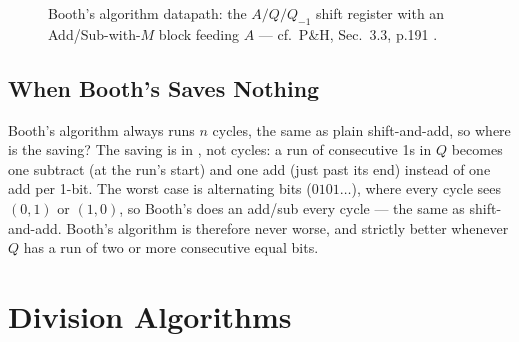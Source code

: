 \documentclass[11pt]{article}
\begin{document}
\begin{figure}[h]
  \centering
  \caption{Booth's algorithm datapath: the $A/Q/Q_{-1}$ shift register with an Add/Sub-with-$M$ block feeding $A$ --- cf.\ P\&H, Sec.~3.3, p.191 \cite{PattersonHennessy2017_computer_organization_design}.}
  \label{fig:booth}
\end{figure}

\subsection{When Booth's Saves Nothing}

Booth's algorithm always runs $n$ cycles, the same as plain shift-and-add, so where is the saving? The saving is in , not cycles: a run of consecutive 1s in $Q$ becomes one subtract (at the run's start) and one add (just past its end) instead of one add per 1-bit. The worst case is alternating bits ($0101\dots$), where every cycle sees $(0,1)$ or $(1,0)$, so Booth's does an add/sub every cycle --- the same as shift-and-add. Booth's algorithm is therefore never worse, and strictly better whenever $Q$ has a run of two or more consecutive equal bits.

\section{Division Algorithms}
\label{sec:division}
\end{document}
